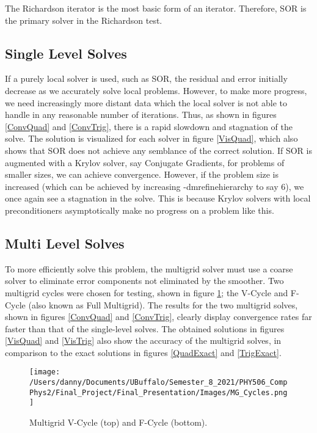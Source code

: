 \documentclass[]{article}
\theoremstyle{definition}
\begin{document}
The Richardson iterator is the most basic form of an iterator.  Therefore, SOR is the primary solver in the Richardson test.

\subsection{Single Level Solves}

If a purely local solver is used, such as SOR, the residual and error initially decrease as we accurately solve local problems.  However, to make more progress, we need increasingly more distant data which the local solver is not able to handle in any reasonable number of iterations.  Thus, as shown in figures \ref{ConvQuad} and \ref{ConvTrig}, there is a rapid slowdown and stagnation of the solve.  The solution is visualized for each solver in figure \ref{VisQuad}, which also shows that SOR does not achieve any semblance of the correct solution.  If SOR is augmented with a Krylov solver, say Conjugate Gradients, for problems of smaller sizes, we can achieve convergence.  However, if the problem size is increased (which can be achieved by increasing -dm\textunderscore refine\textunderscore hierarchy to say 6), we once again see a stagnation in the solve.  This is because Krylov solvers with local preconditioners asymptotically make no progress on a problem like this.

\subsection{Multi Level Solves}

To more efficiently solve this problem, the multigrid solver must use a coarse solver to eliminate error components not eliminated by the smoother.  Two multigrid cycles were chosen for testing, shown in figure \ref{MGCyc}; the V-Cycle and F-Cycle (also known as Full Multigrid).  The results for the two multigrid solves, shown in figures \ref{ConvQuad} and \ref{ConvTrig}, clearly display convergence rates far faster than that of the single-level solves.  The obtained solutions in figures \ref{VisQuad} and \ref{VisTrig} also show the accuracy of the multigrid solves, in comparison to the exact solutions in figures \ref{QuadExact} and \ref{TrigExact}.

\begin{figure}[H]
\begin{center}
\texttt{[image: /Users/danny/Documents/UBuffalo/Semester\_8\_2021/PHY506\_CompPhys2/Final\_Project/Final\_Presentation/Images/MG\_Cycles.png]}
\end{center}
\caption{Multigrid V-Cycle (top) and F-Cycle (bottom).}
\label{MGCyc}
\end{figure}
\end{document}
